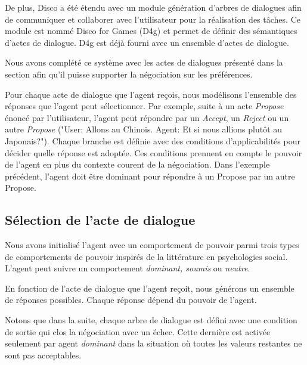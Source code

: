 	De plus, Disco a été étendu avec un module génération d'arbres de dialogues afin de communiquer et collaborer avec l'utilisateur pour la réalisation des tâches. Ce module est nommé Disco for Games (D4g) et permet de définir des sémantiques d'actes de dialogue. D4g est déjà fourni avec un ensemble d'actes de dialogue.
	
	Nous avons complété ce système avec les actes de dialogues présenté dans la section \label{sec:communication} afin qu'il puisse supporter la négociation sur les préférences.
	
	Pour chaque acte de dialogue que l'agent reçois, nous modélisons l'ensemble des réponses que l'agent peut sélectionner. Par exemple, suite à un acte \emph{Propose} énoncé par l'utilisateur, l'agent peut répondre par un \emph{Accept}, un \emph{Reject} ou un autre \emph{Propose} ("User: Allons au Chinois. Agent: Et si nous allions plutôt au Japonais?"). 
	Chaque branche est définie avec des conditions d'applicabilités pour décider quelle réponse est adoptée. 
	Ces conditions prennent en compte le pouvoir de l'agent en plus du contexte courent de la négociation. Dans l'exemple précédent, l'agent doit être dominant pour répondre à un Propose par un autre Propose. 
	
	

	
	\subsection{Sélection de l'acte de dialogue}
		Nous avons initialisé l'agent avec un comportement de pouvoir parmi trois types de comportements de pouvoir inspirés de la littérature en psychologies social.  L'agent peut suivre un comportement \emph{dominant, soumis} ou \emph{neutre}. 
		
		En fonction de l'acte de dialogue que l'agent reçoit, nous générons un ensemble de réponses possibles. Chaque réponse dépend du pouvoir de l'agent.
		
		Notons que dans la suite, chaque arbre de dialogue est défini avec une condition de sortie qui clos la négociation avec un échec. Cette dernière est activée seulement par agent \emph{dominant} dans la situation où toutes les valeurs restantes ne sont pas acceptables. 
